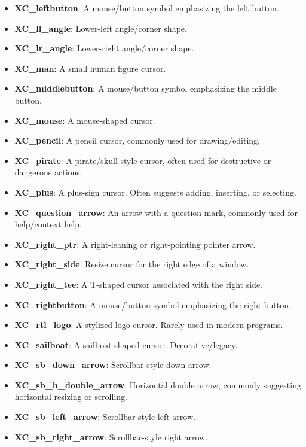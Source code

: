 \documentclass{report}
\begin{document}
\begin{itemize}
\begin{itemize}
                \item \textbf{XC\_leftbutton}:	A mouse/button symbol emphasizing the left button.
                \item \textbf{XC\_ll\_angle}:	Lower-left angle/corner shape.
                \item \textbf{XC\_lr\_angle}:	Lower-right angle/corner shape.
                \item \textbf{XC\_man}:	A small human figure cursor.
                \item \textbf{XC\_middlebutton}:	A mouse/button symbol emphasizing the middle button.
                \item \textbf{XC\_mouse}:	A mouse-shaped cursor.
                \item \textbf{XC\_pencil}:	A pencil cursor, commonly used for drawing/editing.
                \item \textbf{XC\_pirate}:	A pirate/skull-style cursor, often used for destructive or dangerous actions.
                \item \textbf{XC\_plus}:	A plus-sign cursor. Often suggests adding, inserting, or selecting.
                \item \textbf{XC\_question\_arrow}:	An arrow with a question mark, commonly used for help/context help.
                \item \textbf{XC\_right\_ptr}:	A right-leaning or right-pointing pointer arrow.
                \item \textbf{XC\_right\_side}:	Resize cursor for the right edge of a window.
                \item \textbf{XC\_right\_tee}:	A T-shaped cursor associated with the right side.
                \item \textbf{XC\_rightbutton}:	A mouse/button symbol emphasizing the right button.
                \item \textbf{XC\_rtl\_logo}:	A stylized logo cursor. Rarely used in modern programs.
                \item \textbf{XC\_sailboat}:	A sailboat-shaped cursor. Decorative/legacy.
                \item \textbf{XC\_sb\_down\_arrow}:	Scrollbar-style down arrow.
                \item \textbf{XC\_sb\_h\_double\_arrow}:	Horizontal double arrow, commonly suggesting horizontal resizing or scrolling.
                \item \textbf{XC\_sb\_left\_arrow}:	Scrollbar-style left arrow.
                \item \textbf{XC\_sb\_right\_arrow}:	Scrollbar-style right arrow.

\end{itemize}
\end{itemize}
\end{document}
